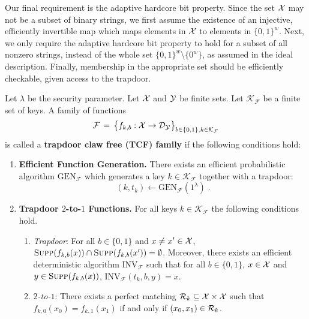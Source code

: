 Our final requirement is the adaptive hardcore bit property. Since the set $\mathcal{X}$ may not be a subset of binary strings, we first assume the existence of an injective, efficiently invertible map which maps elements in $\mathcal{X}$ to elements in $\{0,1\}^w$. Next, we only require the adaptive hardcore bit property to hold for a subset of all nonzero strings, instead of the whole set $\{0,1\}^w\setminus \{0^w\}$, as assumed in the ideal description. Finally, membership in the appropriate set should be efficiently checkable, given access to the trapdoor. 



\begin{definition}\label{def:trapdoorclawfree}
Let $\lambda$ be the security parameter. Let $\mathcal{X}$ and $\mathcal{Y}$ be finite sets.
 Let $\mathcal{K}_{\mathcal{F}}$ be a finite set of keys. A family of functions 
$$\mathcal{F} \,=\, \big\{f_{k,b} : \mathcal{X}\rightarrow \mathcal{D}_{\mathcal{Y}} \big\}_{b\in\{0,1\},k\in \mathcal{K}_{\mathcal{F}}}$$
is called a \textbf{trapdoor claw free (TCF) family} if the following conditions hold:

\begin{enumerate}
\item{\textbf{Efficient Function Generation.}} There exists an efficient probabilistic algorithm $\textrm{GEN}_{\mathcal{F}}$ which generates a key $k\in \mathcal{K}_{\mathcal{F}}$ together with a trapdoor: 
$$(k,t_k) \leftarrow \textrm{GEN}_{\mathcal{F}}(1^\lambda)\;.$$
\item{\textbf{Trapdoor $2$-to-$1$ Functions.}} For all keys $k\in \mathcal{K}_{\mathcal{F}}$ the following conditions hold. 
\begin{enumerate}
\item \textit{Trapdoor}: For all $b\in\{0,1\}$ and $x\neq x' \in \mathcal{X}$, $\textsc{Supp}(f_{k,b}(x))\cap \textsc{Supp}(f_{k,b}(x')) = \emptyset$. Moreover, there exists an efficient deterministic algorithm $\textrm{INV}_{\mathcal{F}}$ such that for all $b\in \{0,1\}$,  $x\in \mathcal{X}$ and $y\in \textsc{Supp}(f_{k,b}(x))$, $\textrm{INV}_{\mathcal{F}}(t_k,b,y) = x$. 
\item \textit{$2$-to-$1$}: There exists a perfect matching $\mathcal{R}_k \subseteq \mathcal{X} \times \mathcal{X}$ such that $f_{k,0}(x_0) = f_{k,1}(x_1)$ if and only if $(x_0,x_1)\in \mathcal{R}_k$. \end{enumerate}


\end{enumerate}
\end{definition}

